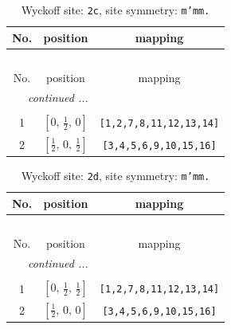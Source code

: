 \documentclass[fleqn,8pt]{jsarticle}
\begin{document}
\renewcommand{\arraystretch}{1.2}
\begin{longtable}{ccc}
\caption{Wyckoff site: {\tt 2c}, site symmetry: {\tt m'mm.}}
 \\
 \hline \hline
No. & position & mapping \\ \hline \endfirsthead

\multicolumn{2}{l}{\tablename\ \thetable{}} \\
 \hline \hline
No. & position & mapping \\ \hline \endhead

 \hline \hline
\multicolumn{2}{r}{\footnotesize\it continued ...} \\ \endfoot

 \hline \hline
\multicolumn{2}{r}{} \\ \endlastfoot

1 & $\left[ 0,\, \frac{1}{2},\, 0 \right]$ & {\tt [1,2,7,8,11,12,13,14]} \\ \hline
2 & $\left[ \frac{1}{2},\, 0,\, \frac{1}{2} \right]$ & {\tt [3,4,5,6,9,10,15,16]} \\
\end{longtable}
\renewcommand{\arraystretch}{1.2}
\begin{longtable}{ccc}
\caption{Wyckoff site: {\tt 2d}, site symmetry: {\tt m'mm.}}
 \\
 \hline \hline
No. & position & mapping \\ \hline \endfirsthead

\multicolumn{2}{l}{\tablename\ \thetable{}} \\
 \hline \hline
No. & position & mapping \\ \hline \endhead

 \hline \hline
\multicolumn{2}{r}{\footnotesize\it continued ...} \\ \endfoot

 \hline \hline
\multicolumn{2}{r}{} \\ \endlastfoot

1 & $\left[ 0,\, \frac{1}{2},\, \frac{1}{2} \right]$ & {\tt [1,2,7,8,11,12,13,14]} \\ \hline
2 & $\left[ \frac{1}{2},\, 0,\, 0 \right]$ & {\tt [3,4,5,6,9,10,15,16]} \\
\end{longtable}
\renewcommand{\arraystretch}{1.2}
\end{document}

